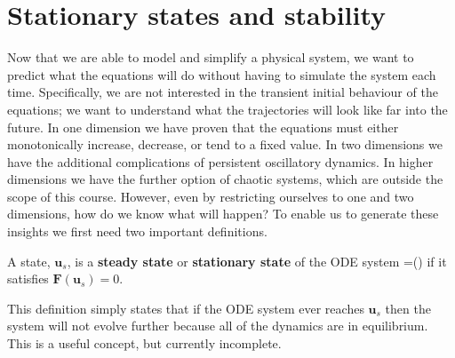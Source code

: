 \chapter{Stationary states and stability}\label{Stationary states and stability}
Now that we are able to model and simplify a physical system, we want to predict what the equations will do without having to simulate the system each time. Specifically, we are not interested in the transient initial behaviour of the equations; we want to understand what the trajectories will look like far into the future. In one dimension we have proven that the equations must either monotonically increase, decrease, or tend to a fixed value. In two dimensions we have the additional complications of persistent oscillatory dynamics. In higher dimensions we have the further option of chaotic systems, which are outside the scope of this course. However, even by restricting ourselves to one and two dimensions, how do we know what will happen? To enable us to generate these insights we first need two important definitions.
\begin{defin}
A state, $\bm{u}_s$, is a \textbf{steady state} or \textbf{stationary state} of the ODE system
\bb
{}=()
\ee
if it satisfies $\bm{F}(\bm{u}_s)=0$.
\end{defin}
This definition simply states that if the ODE system ever reaches $\bm{u}_s$ then the system will not evolve further because all of the dynamics are in equilibrium. This is a useful concept, but currently incomplete.


